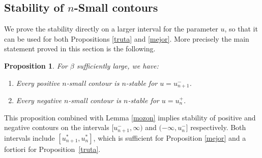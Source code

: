 \documentclass[10pt]{amsart}
\newenvironment{enumeratei}
{\bgroup\def\theenumi{\roman{enumi}}\def\theenumii{\Alph{enumii}}\begin{enumerate}}
{\end{enumerate}\egroup}
\numberwithin{equation}{section}
\theoremstyle{plain}
\newtheorem{proposition}[theorem]{Proposition}
\theoremstyle{definition}
\newcommand{\gb}{\beta}
\begin{document}
\subsection{Stability of $n$-Small contours}\label{smallcproof}

We prove the stability directly on a larger interval for the parameter $u$, so that it can be used for both Propositions \ref{truta} and \ref{mejor}.
More precisely the main statement proved in this section is the following.

\begin{proposition}\label{lesmall}
For $\gb$ sufficiently large, we have:
\begin{enumeratei}
\item
Every positive $n$-small contour is $n$-stable for $u=u^{-}_{n+1}$.
\item
Every negative $n$-small contour is $n$-stable for $u=u^{+}_n$.
\end{enumeratei}

\end{proposition}
This proposition combined with Lemma \ref{mozon} implies stability of positive and negative contours on the intervals $[u^{-}_{n+1},\infty)$ and
$(-\infty,u^{-}_{n}]$ respectively.
Both intervals include $[u^*_{n+1},u^*_n]$, which is sufficient
for Proposition \ref{mejor} and a fortiori for Proposition~\ref{truta}.
\end{document}
